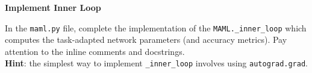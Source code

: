 \item {} {\bf Implement Inner Loop}

In the \texttt{maml.py} file, complete the implementation of the \texttt{MAML.\_inner\_loop} which computes the task-adapted network parameters (and accuracy metrics). Pay attention to the inline comments and docstrings. \\ 
\textbf{Hint}: the simplest way to implement \texttt{\_inner\_loop} involves using \texttt{autograd.grad}.